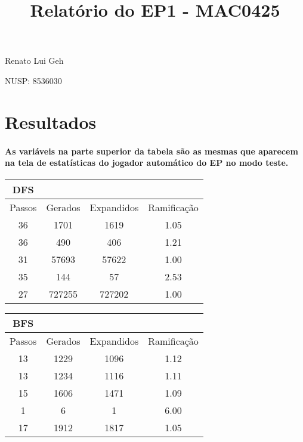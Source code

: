 \documentclass[a4paper,10pt]{article}
\title{\textbf{Relatório do EP1 - MAC0425}}
\theoremstyle{plain}
\begin{document}
\date{}
\author{}
\vspace*{-40pt}
{\let\newpage\relax\maketitle}

Renato Lui Geh

NUSP: 8536030

\section{Resultados}

\paragraph{
  As variáveis na parte superior da tabela são as mesmas que aparecem
na tela de estatísticas do jogador automático do EP no modo teste.
}

\begin{table}[h]
\begin{center}
\captionsetup{justification=centering}
\begin{tabular}{*{3}{c|} c}
DFS \\
\hline
Passos & Gerados & Expandidos & Ramificação \\
\hline
36 & 1701   & 1619    & 1.05 \\
36 & 490    & 406     & 1.21 \\
31 & 57693  & 57622   & 1.00 \\
35 & 144    & 57      & 2.53 \\ 
27 & 727255 & 727202  & 1.00 \\
\end{tabular}
\end{center}
\end{table}

\begin{table}[h]
\begin{center}
\begin{tabular}{*{3}{c|} c}
BFS \\
\hline
Passos & Gerados & Expandidos & Ramificação \\
\hline
13 & 1229 & 1096 & 1.12 \\
13 & 1234 & 1116 & 1.11 \\
15 & 1606 & 1471 & 1.09 \\
1  & 6    &  1   & 6.00 \\
17 & 1912 & 1817 & 1.05 \\
\end{tabular}
\end{center}
\end{table}
\end{document}
